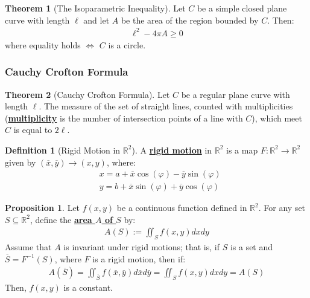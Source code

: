 \documentclass[11pt]{scrartcl}
\newcommand{\R}[0]{\mathbb{R}}
\theoremstyle{definition}
\newtheorem{theorem}{Theorem}
\newtheorem{definition}{Definition}
\newtheorem{prop}{Proposition}
\theoremstyle{remark}
\newcommand{\dfn}[1]{\textbf{\underline{#1}}}
\begin{document}
{\begin{theorem}[The Isoparametric Inequality]
	Let $C$ be a simple closed plane curve with length $\ell$ and let $A$ be the area of the region bounded by $C$. Then: 
	\begin{align}
		\ell^2 - 4 \pi A \geq 0 	
	\end{align}
	where equality holds $\iff$ $C$ is a circle. 

\end{theorem}

\subsubsection{Cauchy Crofton Formula}

\begin{theorem}[Cauchy Crofton Formula]
	Let $C$ be a regular plane curve with length $\ell$. The measure of the set of straight lines, counted with multiplicities (\dfn{multiplicity} is the number of intersection points of a line with $C$), which meet $C$ is equal to $2 \ell$. 
\end{theorem}

\begin{definition}[Rigid Motion in $\R^2$]
	A \dfn{rigid motion} in $\R^2$ is a map $F: \R^2 \rightarrow \R^2$ given by $(\overline{x}, \overline{y}) \rightarrow (x,y)$, where: 
	\begin{align*}
		& x = a + \overline{x} \cos(\varphi) - \overline{y} \sin( \varphi) \\
		& y = b + \overline{x} \sin( \varphi) + \overline{y} \cos (\varphi) 
	\end{align*}
\end{definition}

\begin{prop}
	Let $f(x,y)$ be a continuous function defined in $\R^2$. For any set $S \subseteq \R^2$, define the \dfn{area $A$ of $S$} by: 
	\begin{align}
	A(S) := \iint_{S} f(x,y) dx dy 	
	\end{align}
	Assume that $A$ is invariant under rigid motions; that is, if $S$ is a set and $\overline{S} = F^{-1}(S)$, where $F$ is a rigid motion, then if: 
	\begin{align*}
		A (\overline{S} ) = \iint_{\overline{S}} f(\overline{x}, \overline{y}) d \overline{x} d \overline{y} 	= \iint_{S} f(x,y) dx dy 	= A(S)
	\end{align*}
	Then, $f(x,y)$ is a constant. 
\end{prop}


}
\end{document}
